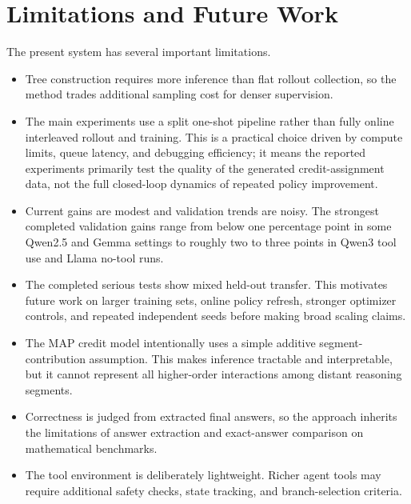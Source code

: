 \documentclass{article}
\begin{document}
\section{Limitations and Future Work}
The present system has several important limitations.
\begin{itemize}
    \item Tree construction requires more inference than flat rollout collection, so the method trades additional sampling cost for denser supervision.
    \item The main experiments use a split one-shot pipeline rather than fully online interleaved rollout and training. This is a practical choice driven by compute limits, queue latency, and debugging efficiency; it means the reported experiments primarily test the quality of the generated credit-assignment data, not the full closed-loop dynamics of repeated policy improvement.
    \item Current gains are modest and validation trends are noisy. The strongest completed validation gains range from below one percentage point in some Qwen2.5 and Gemma settings to roughly two to three points in Qwen3 tool use and Llama no-tool runs.
    \item The completed serious tests show mixed held-out transfer. This motivates future work on larger training sets, online policy refresh, stronger optimizer controls, and repeated independent seeds before making broad scaling claims.
    \item The MAP credit model intentionally uses a simple additive segment-contribution assumption. This makes inference tractable and interpretable, but it cannot represent all higher-order interactions among distant reasoning segments.
    \item Correctness is judged from extracted final answers, so the approach inherits the limitations of answer extraction and exact-answer comparison on mathematical benchmarks.
    \item The tool environment is deliberately lightweight. Richer agent tools may require additional safety checks, state tracking, and branch-selection criteria.
\end{itemize}
\end{document}

